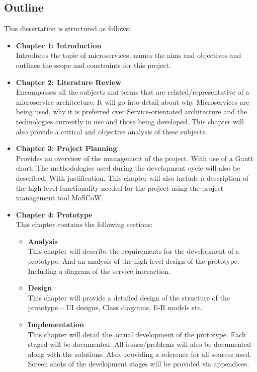 	\subsection{Outline}
	This dissertation is structured as follows:
		\begin{itemize}\itemsep0pt
			\item \textbf{Chapter 1: Introduction}
			\\Introduces the topic of microservices, names the aims and objectives and outlines the scope and constraints for this project.
			\item \textbf{Chapter 2: Literature Review}
			\\Encompasses all the subjects and terms that are related/representative of a microservice architecture. It will go into detail about why Microservices are being used, why it is preferred over Service-orientated architecture and the technologies currently in use and those being developed. This chapter will also provide a critical and objective analysis of these subjects. 
			\item \textbf{Chapter 3: Project Planning}
			\\Provides an overview of the management of the project. With use of a Gantt chart. The methodologies used during the development cycle will also be described. With justification. This chapter will also include a description of the high level functionality needed for the project using the project management tool MoSCoW.
			\item \textbf{Chapter 4: Prototype} 
			\\ This chapter contains the following sections:
				\begin{itemize}
					\item \textbf{Analysis}
					\\This chapter will describe the requirements for the development of a prototype. And an analysis of the high-level design of the prototype. Including a diagram of the service interaction.
					\item \textbf{Design}
					\\This chapter will provide a detailed design of the structure of the prototype – UI designs, Class diagrams, E-R models etc.
					\item \textbf{Implementation}
					\\This chapter will detail the actual development of the prototype. Each staged will be documented. All issues/problems will also be documented along with the solutions. Also, providing a reference for all sources used. Screen shots of the development stages will be provided via appendices.

\end{itemize}
\end{itemize}
